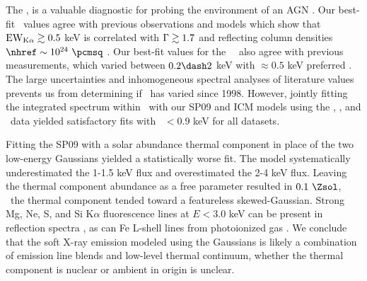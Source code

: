 \documentclass[useAMS,usenatbib]{mn2e}
\begin{document}
The \fekaew, is a valuable diagnostic for probing the environment of
an AGN \citep[see][for a review]{2000PASP..112.1145F}. Our best-fit
\fekaew\ values agree with previous observations and models which show
that $\mathrm{EW}_{\mathrm{K}\alpha} \gtrsim 0.5$ keV is correlated with $\Gamma \gtrsim 1.7$ and
reflecting column densities $\nhref \sim 10^{24} ~\pcmsq$
\citep{1996MNRAS.280..823M, 1997ApJ...477..602N, 1999MNRAS.303L..11Z,
  2005A&A...444..119G}. Our best-fit values for the
\irs\ \fekaew\ also agree with previous measurements, which varied
between $0.2 \dash 2$ keV with $\approx 0.5$ keV preferred
\citep{2000A&A...353..910F, 2001MNRAS.321L..15I,
  2007A&A...473...85P}. The large uncertainties and inhomogeneous
spectral analyses of literature values prevents us from determining if
\fekaew\ has varied since 1998. However, jointly fitting the
integrated spectrum within \rf\ with our SP09 and ICM models using the
\chandra, \xmm, and \bepposax\ data yielded satisfactory fits with
\fekaew\ $< 0.9$ keV for all datasets.

Fitting the SP09 with a solar abundance thermal component in place of
the two low-energy Gaussians yielded a statistically worse fit. The
model systematically underestimated the 1-1.5 keV flux and
overestimated the 2-4 keV flux. Leaving the thermal component
abundance as a free parameter resulted in $0.1 ~\Zsol$, \ie\ the
thermal component tended toward a featureless skewed-Gaussian. Strong
Mg, Ne, S, and Si K$\alpha$ fluorescence lines at $E < 3.0$ keV can be
present in reflection spectra \citep{1991MNRAS.249..352G}, as can Fe
L-shell lines from photoionized gas \citep{1990ApJ...362...90B}. We
conclude that the soft X-ray emission modeled using the Gaussians is
likely a combination of emission line blends and low-level thermal
continuum, whether the thermal component is nuclear or ambient in
origin is unclear.

\end{document}

